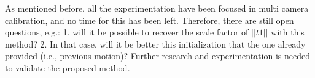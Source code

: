 As mentioned before, all the experimentation have been focused in multi camera calibration, and no time for this has been left. Therefore, there are still open questions, e.g.: 1. will it be possible to recover the scale factor of $||t1||$ with this method? 2. In that case, will it be better this initialization that the one already provided (i.e., previous motion)? Further research and experimentation is needed to validate the proposed method.







